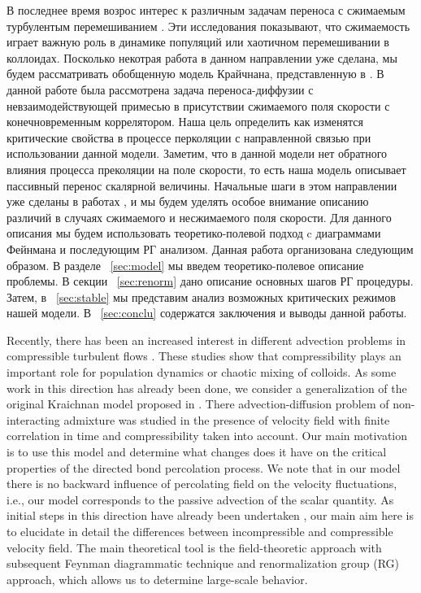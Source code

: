 \documentclass[12pt]{article}
\begin{document}
В последнее время возрос интерес к различным задачам переноса с сжимаемым турбулентым перемешиванием \cite{Benzi09,Pig12,Volk14,depietro15}.
Эти исследования показывают, что сжимаемость играет важную роль в динамике популяций или хаотичном перемешивании в коллоидах. 
Посколько некотрая работа в данном направлении уже сделана, мы будем рассматривать обобщенную модель Крайчнана, представленную в \cite{Ant00}.
В данной работе была рассмотрена задача переноса-диффузии с невзаимодействующей примесью в присутствии сжимаемого поля скорости с конечновременным коррелятором.
Наша цель определить как изменятся критические свойства в процессе перколяции с направленной связью при использовании данной модели.
Заметим, что в данной модели нет обратного влияния процесса преколяции на поле скорости, то есть наша модель описывает пассивный перенос скалярной величины.
Начальные шаги в этом направлении уже сделаны в работах \cite{AntKap08,AntKap10,Ant11,DP13}, и мы будем уделять особое внимание описанию различий в случаях сжимаемого и несжимаемого поля скорости.
Для данного описания мы будем использовать теоретико-полевой подход \cite{Vasiliev} c диаграммами Фейнмана и последующим РГ анализом.
Данная работа организована следующим образом.
В разделе ~\ref{sec:model} мы введем теоретико-полевое описание проблемы.
В секции ~\ref{sec:renorm} дано описание основных шагов РГ процедуры.
Затем, в ~\ref{sec:stable} мы представим анализ возможных критических режимов нашей модели.
В ~\ref{sec:conclu} содержатся заключения и выводы данной работы.

Recently, there has been an increased interest in different advection problems in 
compressible turbulent flows \cite{Benzi09,Pig12,Volk14,depietro15}. These studies show that
compressibility plays an important role for population dynamics or chaotic mixing of colloids.
As some work in this direction has already been done, we  
 consider a generalization of the original Kraichnan model proposed in \cite{Ant00}.  There
advection-diffusion problem of non-interacting admixture  was studied
in the presence of velocity field with finite correlation in time and compressibility taken into account.
 Our main motivation is to use this model and determine what changes does it have
 on the critical properties of the directed bond percolation process. 
   We note that in our model there is no backward influence of percolating
 field on the velocity fluctuations, i.e., our model corresponds to
 the passive advection of the scalar quantity.
As initial steps in this direction have already been undertaken \cite{AntKap08,AntKap10,Ant11,DP13}, our main
aim here is to elucidate in detail the
 differences between incompressible and compressible velocity field. The main
 theoretical tool is the field-theoretic approach \cite{Vasiliev} with subsequent Feynman diagrammatic
 technique and renormalization group (RG) approach, which allows us to determine large-scale
 behavior.
 
\end{document}
